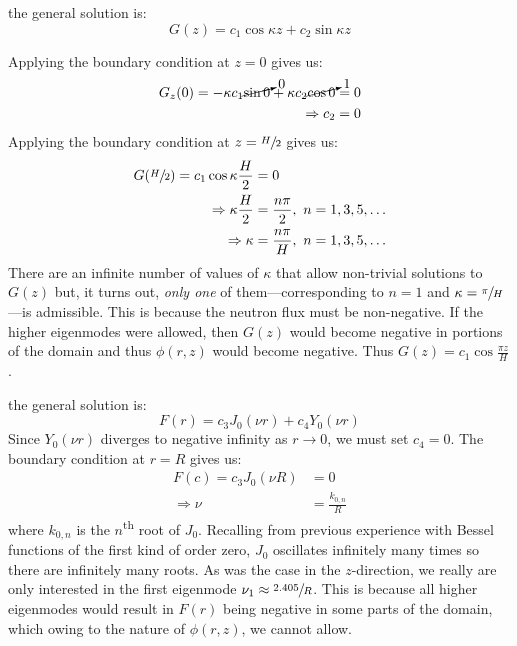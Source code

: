  the general solution is:
\begin{equation*}
G(z) = c_1\cos{\kappa z} + c_2 \sin{\kappa z}
\end{equation*}

Applying the boundary condition at $z=0$ gives us:
\begin{align*}
G_z(0) = -\kappa c_1 \cancelto{0}{\sin{0}} + \kappa c_2 \cancelto{1}{\cos{0}} &= 0 \\
\Rightarrow c_2 &= 0 
\end{align*}
Applying the boundary condition at $z=\sfrac{H}{2}$ gives us:
\begin{align*}
G(\sfrac{H}{2}) = c_1 \cos{\kappa \frac{H}{2}} &= 0 \\
\Rightarrow \kappa \frac{H}{2} &= \frac{n\pi}{2}, \ n=1,3,5,\dots \\
\Rightarrow \kappa &= \frac{n \pi}{H}, \ n=1,3,5,\dots
\end{align*}
There are an infinite number of values of $\kappa$ that allow non-trivial solutions to $G(z)$ but, it turns out, \emph{only one} of them---corresponding to $n=1$ and $\kappa = \sfrac{\pi}{H}$---is admissible.  This is because the neutron flux must be non-negative.  If the higher eigenmodes were allowed, then $G(z)$ would become negative in portions of the domain and thus $\phi(r,z)$ would become negative. Thus $G(z) = c_1\cos{\frac{\pi z}{H}}$.  

 the general solution is:
\begin{equation*}
F(r) = c_3J_0(\nu r) + c_4Y_0(\nu r)
\end{equation*}
Since $Y_0(\nu r)$ diverges to negative infinity as $r \to 0$, we must set $c_4 = 0$. The boundary condition at $r=R$ gives us:
\begin{align*}
F(c) = c_3 J_0(\nu R) &= 0 \\
\Rightarrow \nu &= \frac{k_{0,n}}{R}
\end{align*}
where $k_{0,n}$ is the $n$\textsuperscript{th} root of $J_0$.  Recalling from previous experience with Bessel functions of the first kind of order zero, $J_0$ oscillates infinitely many times so there are infinitely many roots.  As was the case in the $z$-direction, we really are only interested in the first eigenmode $\nu_1 \approx \sfrac{2.405}{R}$.  This is because all higher eigenmodes would result in $F(r)$ being negative in some parts of the domain, which owing to the nature of $\phi(r,z)$, we cannot allow.

